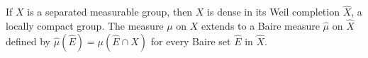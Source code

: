 If $X$ is a separated measurable group, then $X$ is dense in its Weil completion $\hat{X}$, a locally compact group. The measure $\mu$ on $X$ extends to a Baire measure $\hat{\mu}$ on $\hat{X}$ defined by $\hat{\mu}(\hat{E}) = \mu(\hat{E} \cap X)$ for every Baire set $\hat{E}$ in $\hat{X}$.
